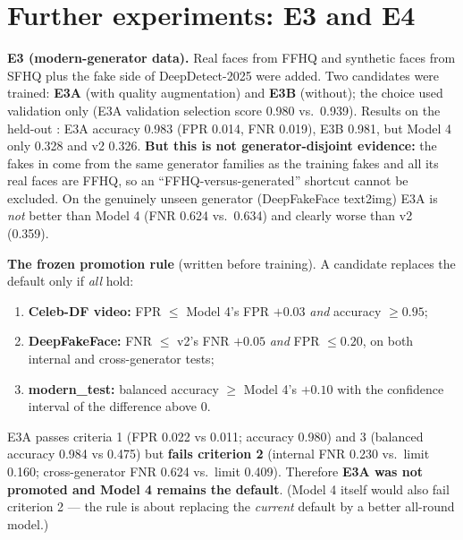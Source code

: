 \documentclass[11pt,a4paper]{report}
\newcommand{\code}[1]{\texttt{\detokenize{#1}}}
\begin{document}
\section{Further experiments: E3 and E4}
\textbf{E3 (modern-generator data).} Real faces from FFHQ and synthetic faces from SFHQ plus the fake side of DeepDetect-2025 were added. Two candidates were trained: \textbf{E3A} (with quality augmentation) and \textbf{E3B} (without); the choice used validation only (E3A validation selection score 0.980 vs.\ 0.939). Results on the held-out \code{modern_test}: E3A accuracy 0.983 (FPR 0.014, FNR 0.019), E3B 0.981, but Model 4 only 0.328 and v2 0.326.
\textbf{But this is not generator-disjoint evidence:} the fakes in \code{modern_test} come from the same generator families as the training fakes and all its real faces are FFHQ, so an ``FFHQ-versus-generated'' shortcut cannot be excluded.
On the genuinely unseen generator (DeepFakeFace text2img) E3A is \emph{not} better than Model 4 (FNR 0.624 vs.\ 0.634) and clearly worse than v2 (0.359).

\textbf{The frozen promotion rule} (written before training). A candidate replaces the default only if \emph{all} hold:
\begin{enumerate}
\item \textbf{Celeb-DF video:} FPR $\le$ Model 4's FPR $+0.03$ \emph{and} accuracy $\ge0.95$;
\item \textbf{DeepFakeFace:} FNR $\le$ v2's FNR $+0.05$ \emph{and} FPR $\le0.20$, on both internal and cross-generator tests;
\item \textbf{modern\_test:} balanced accuracy $\ge$ Model 4's $+0.10$ with the confidence interval of the difference above 0.
\end{enumerate}
E3A passes criteria 1 (FPR 0.022 vs 0.011; accuracy 0.980) and 3 (balanced accuracy 0.984 vs 0.475) but \textbf{fails criterion 2} (internal FNR 0.230 vs.\ limit 0.160; cross-generator FNR 0.624 vs.\ limit 0.409). Therefore \textbf{E3A was not promoted and Model 4 remains the default}. (Model 4 itself would also fail criterion 2 --- the rule is about replacing the \emph{current} default by a better all-round model.)
\end{document}
